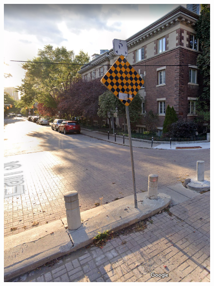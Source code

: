 \documentclass[aspectratio=169]{beamer}
\begin{document}
\begin{frame}
\begin{columns}
		\begin{column}{0.5\textwidth}
			\begin{figure}
				\centering
				\includegraphics[width=0.9\linewidth]{images/earl_bike.png}
			\end{figure}
			
		\end{column}
		
		
		
	\end{columns}
	
	
\end{frame}
\end{document}
